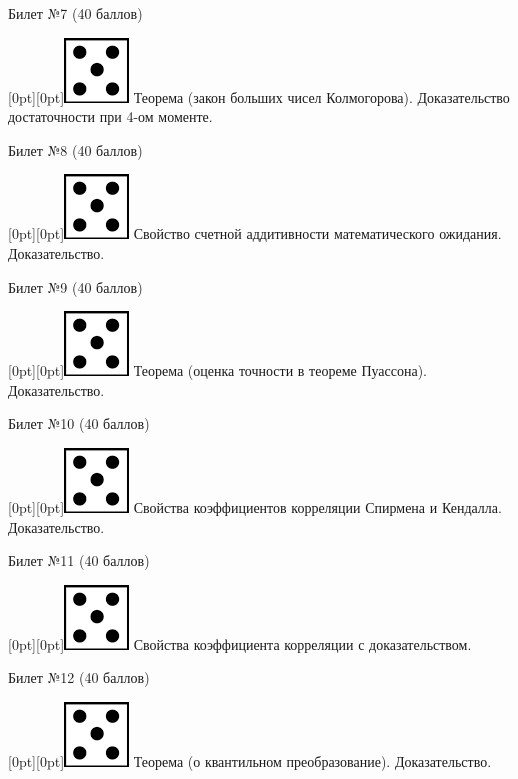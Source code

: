 \documentclass[preview]{standalone}
\begin{document}
\begin{center} {\Large Билет №7 (40 баллов)} \end{center}
\raisebox{-1pt}[0pt][0pt]{\includegraphics[width=0.02\linewidth]{5.png}} Теорема (закон больших чисел Колмогорова). Доказательство достаточности при 4-ом моменте. \\
\begin{center} {\Large Билет №8 (40 баллов)} \end{center}
\raisebox{-1pt}[0pt][0pt]{\includegraphics[width=0.02\linewidth]{5.png}}  Свойство счетной аддитивности математического ожидания. Доказательство. \\
\begin{center} {\Large Билет №9 (40 баллов)} \end{center}
\raisebox{-1pt}[0pt][0pt]{\includegraphics[width=0.02\linewidth]{5.png}} Теорема (оценка точности в теореме Пуассона). Доказательство. \\
\begin{center} {\Large Билет №10 (40 баллов)} \end{center}
\raisebox{-1pt}[0pt][0pt]{\includegraphics[width=0.02\linewidth]{5.png}} Свойства коэффициентов корреляции Спирмена и Кендалла. Доказательство. \\ 
\begin{center} {\Large Билет №11 (40 баллов)} \end{center}
\raisebox{-1pt}[0pt][0pt]{\includegraphics[width=0.02\linewidth]{5.png}} Свойства коэффициента корреляции с доказательством. \\
\begin{center} {\Large Билет №12 (40 баллов)} \end{center}
\raisebox{-1pt}[0pt][0pt]{\includegraphics[width=0.02\linewidth]{5.png}}  Теорема (о квантильном преобразование). Доказательство. \\
\end{document}
